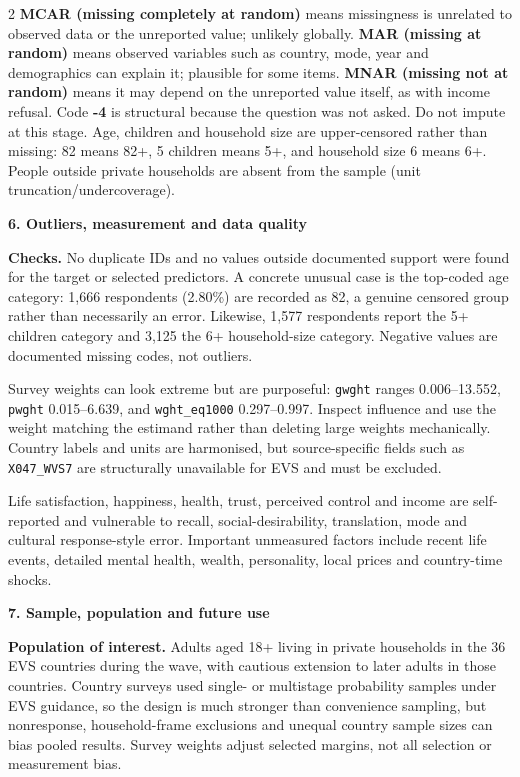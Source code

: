 \documentclass[10pt,a4paper]{article}
\newcommand{\ReportSection}[2]{%
  \vspace{3pt}%
  {\fontsize{9.5}{10.5}\selectfont\bfseries\color{Navy}#1. #2}\par
  \vspace{1pt}%
}
\begin{document}
\begin{multicols}{2}
\textbf{MCAR (missing completely at random)} means missingness is unrelated to observed data or the unreported value; unlikely globally. \textbf{MAR (missing at random)} means observed variables such as country, mode, year and demographics can explain it; plausible for some items. \textbf{MNAR (missing not at random)} means it may depend on the unreported value itself, as with income refusal. Code \textbf{-4} is structural because the question was not asked. Do not impute at this stage. Age, children and household size are upper-censored rather than missing: 82 means 82+, 5 children means 5+, and household size 6 means 6+. People outside private households are absent from the sample (unit truncation/undercoverage).

\ReportSection{6}{Outliers, measurement and data quality}
\textbf{Checks.} No duplicate IDs and no values outside documented support were found for the target or selected predictors. A concrete unusual case is the top-coded age category: 1,666 respondents (2.80\%) are recorded as 82, a genuine censored group rather than necessarily an error. Likewise, 1,577 respondents report the 5+ children category and 3,125 the 6+ household-size category. Negative values are documented missing codes, not outliers.

Survey weights can look extreme but are purposeful: \texttt{gwght} ranges 0.006--13.552, \texttt{pwght} 0.015--6.639, and \texttt{wght\_eq1000} 0.297--0.997. Inspect influence and use the weight matching the estimand rather than deleting large weights mechanically. Country labels and units are harmonised, but source-specific fields such as \texttt{X047\_WVS7} are structurally unavailable for EVS and must be excluded.

Life satisfaction, happiness, health, trust, perceived control and income are self-reported and vulnerable to recall, social-desirability, translation, mode and cultural response-style error. Important unmeasured factors include recent life events, detailed mental health, wealth, personality, local prices and country-time shocks.

\ReportSection{7}{Sample, population and future use}
\textbf{Population of interest.} Adults aged 18+ living in private households in the 36 EVS countries during the wave, with cautious extension to later adults in those countries. Country surveys used single- or multistage probability samples under EVS guidance, so the design is much stronger than convenience sampling, but nonresponse, household-frame exclusions and unequal country sample sizes can bias pooled results. Survey weights adjust selected margins, not all selection or measurement bias.


\end{multicols}
\end{document}
